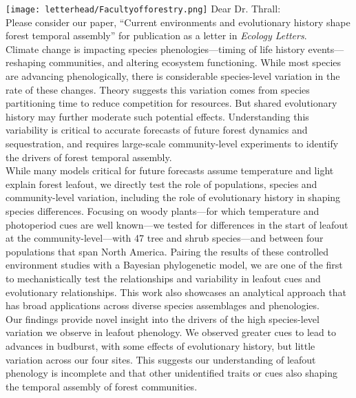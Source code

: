 \documentclass[11pt,a4paper]{article}
\begin{document}

\noindent \texttt{[image: letterhead/Facultyofforestry.png]}
\noindent Dear Dr. Thrall:
\vspace{1.5ex}\\
\noindent Please consider our paper, ``Current environments and evolutionary history shape forest temporal assembly'' for publication as a letter in \emph{Ecology Letters}. 
\vspace{1.5ex}\\ 
\noindent Climate change is impacting species phenologies---timing of life history events---reshaping communities, and altering ecosystem functioning. While most species are advancing phenologically, there is considerable species-level variation in the rate of these changes. Theory suggests this variation comes from species partitioning time to reduce competition for resources. But shared evolutionary history may further moderate such potential effects. Understanding this variability is critical to accurate forecasts of future forest dynamics and sequestration, and requires large-scale community-level experiments to identify the drivers of forest temporal assembly.
\vspace{1.5ex}\\
\noindent While many models critical for future forecasts assume temperature and light explain forest leafout, we directly test the role of populations, species and community-level variation, including the role of evolutionary history in shaping species differences. Focusing on woody plants---for which temperature and photoperiod cues are well known---we tested for differences in the start of leafout at the community-level—with 47 tree and shrub species—and between four populations that span North America. Pairing the results of these controlled environment studies with a Bayesian phylogenetic model, we are one of the first to mechanistically test the relationships and variability in leafout cues and evolutionary relationships. This work also showcases an analytical approach that has broad applications across diverse species assemblages and phenologies.
\vspace{1.5ex}\\
\noindent  Our findings provide novel insight into the drivers of the high species-level variation we observe in leafout phenology. We observed greater cues to lead to advances in budburst, with some effects of evolutionary history, but little variation across our four sites. This suggests our understanding of leafout phenology is incomplete and that other unidentified traits or cues also shaping the temporal assembly of forest communities. 
\end{document}
